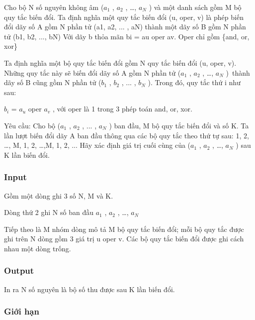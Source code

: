 





   Cho bộ N số nguyên không âm ($a_{1}$   , $a_{2}$   , …, $a_{N}$   ) và một danh sách gồm M bộ quy tắc biến đổi.       Ta định nghĩa một quy tắc biến đổi (u, oper, v) là phép biến đổi dãy số A gồm N phần tử (a1, a2, ... , aN) thành một dãy số B gồm N phần tử (b1, b2, ..., bN)       Với dãy b thỏa mãn       bi = au oper av. Oper chỉ gồm \{and, or, xor\}    

   Ta định nghĩa một bộ quy tắc biến đổi gồm N quy tắc biến đổi (u, oper, v). Những quy tắc này sẽ biến đổi dãy số A gồm N phần tử ($a_{1}$   , $a_{2}$   , …, $a_{N}$   ) thành dãy số B cũng gồm N phần tử ($b_{1}$   , $b_{2}$   , ... , $b_{N}$   ). Trong đó, quy tắc thứ i như sau:  

   $b_{i}$   = $a_{u}$   oper $a_{v}$   , với oper là 1 trong 3 phép toán and, or, xor.  




   Yêu cầu: Cho bộ ($a_{1}$   , $a_{2}$   , ... , $a_{N}$   ) ban đầu, M bộ quy tắc biến đổi và số K. Ta lần lượt biến đổi dãy A ban đầu thông qua các bộ quy tắc theo thứ tự sau: 1, 2, …, M, 1, 2, …,M, 1, 2, ... Hãy xác định giá trị cuối cùng của ($a_{1}$   , $a_{2}$   , …, $a_{N}$   ) sau K lần biến đổi.  

\subsubsection{   Input  }



   Gồm một dòng ghi 3 số N, M và K.  

   Dòng thứ 2 ghi N số ban đầu $a_{1}$   , $a_{2}$   , …, $a_{N}$

    Tiếp theo là M nhóm dòng mô tả M bộ quy tắc biến đổi; mỗi bộ quy tắc được ghi trên N dòng gồm 3 giá trị u oper v. Các bộ quy tắc biến đổi được ghi cách nhau một dòng trống.   

\subsubsection{   Output  }

     In ra N số nguyên là bộ số thu được sau K lần biến đổi.    

\subsubsection{     Giới hạn    }



